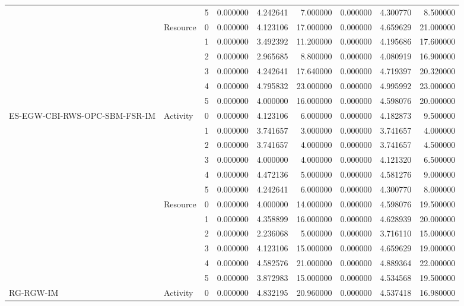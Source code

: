 \begin{tabular}{lllrrrrrr}
 &  & 5 & 0.000000 & 4.242641 & 7.000000 & 0.000000 & 4.300770 & 8.500000 \\
\cline{2-9}
 & \multirow[t]{6}{*}{Resource} & 0 & 0.000000 & 4.123106 & 17.000000 & 0.000000 & 4.659629 & 21.000000 \\
 &  & 1 & 0.000000 & 3.492392 & 11.200000 & 0.000000 & 4.195686 & 17.600000 \\
 &  & 2 & 0.000000 & 2.965685 & 8.800000 & 0.000000 & 4.080919 & 16.900000 \\
 &  & 3 & 0.000000 & 4.242641 & 17.640000 & 0.000000 & 4.719397 & 20.320000 \\
 &  & 4 & 0.000000 & 4.795832 & 23.000000 & 0.000000 & 4.995992 & 23.000000 \\
 &  & 5 & 0.000000 & 4.000000 & 16.000000 & 0.000000 & 4.598076 & 20.000000 \\
\cline{1-9} \cline{2-9}
\multirow[t]{12}{*}{ES-EGW-CBI-RWS-OPC-SBM-FSR-IM} & \multirow[t]{6}{*}{Activity} & 0 & 0.000000 & 4.123106 & 6.000000 & 0.000000 & 4.182873 & 9.500000 \\
 &  & 1 & 0.000000 & 3.741657 & 3.000000 & 0.000000 & 3.741657 & 4.000000 \\
 &  & 2 & 0.000000 & 3.741657 & 4.000000 & 0.000000 & 3.741657 & 4.500000 \\
 &  & 3 & 0.000000 & 4.000000 & 4.000000 & 0.000000 & 4.121320 & 6.500000 \\
 &  & 4 & 0.000000 & 4.472136 & 5.000000 & 0.000000 & 4.581276 & 9.000000 \\
 &  & 5 & 0.000000 & 4.242641 & 6.000000 & 0.000000 & 4.300770 & 8.000000 \\
\cline{2-9}
 & \multirow[t]{6}{*}{Resource} & 0 & 0.000000 & 4.000000 & 14.000000 & 0.000000 & 4.598076 & 19.500000 \\
 &  & 1 & 0.000000 & 4.358899 & 16.000000 & 0.000000 & 4.628939 & 20.000000 \\
 &  & 2 & 0.000000 & 2.236068 & 5.000000 & 0.000000 & 3.716110 & 15.000000 \\
 &  & 3 & 0.000000 & 4.123106 & 15.000000 & 0.000000 & 4.659629 & 19.000000 \\
 &  & 4 & 0.000000 & 4.582576 & 21.000000 & 0.000000 & 4.889364 & 22.000000 \\
 &  & 5 & 0.000000 & 3.872983 & 15.000000 & 0.000000 & 4.534568 & 19.500000 \\
\cline{1-9} \cline{2-9}
\multirow[t]{12}{*}{RG-RGW-IM} & \multirow[t]{6}{*}{Activity} & 0 & 0.000000 & 4.832195 & 20.960000 & 0.000000 & 4.537418 & 16.980000 \\

\end{tabular}
